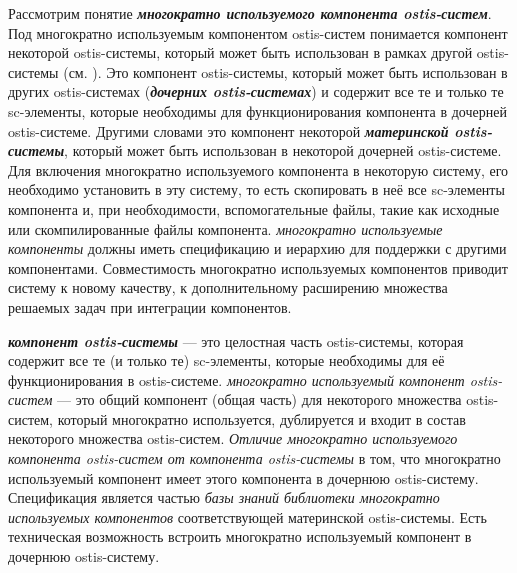 \bigskip

Рассмотрим понятие \textbf{\textit{многократно используемого компонента ostis-систем}}. Под многократно используемым компонентом ostis-систем понимается компонент некоторой ostis-системы, который может быть использован в рамках другой ostis-системы (см. ). Это компонент ostis-системы, который может быть использован в других ostis-системах (\textbf{\textit{дочерних ostis-системах}}) и содержит все те и только те sc-элементы, которые необходимы для функционирования компонента в дочерней ostis-системе. Другими словами это компонент некоторой \textbf{\textit{материнской ostis-системы}}, который может быть использован в некоторой дочерней ostis-системе. Для включения многократно используемого компонента в некоторую систему, его необходимо установить в эту систему, то есть скопировать в неё все sc-элементы компонента и, при необходимости, вспомогательные файлы, такие как исходные или скомпилированные файлы компонента. \textit{многократно используемые компоненты} должны иметь  спецификацию и иерархию для поддержки  с другими компонентами. Совместимость многократно используемых компонентов приводит систему к новому качеству, к дополнительному расширению множества решаемых задач при интеграции компонентов.

\begin{SCn}
\end{SCn}

\textbf{\textit{компонент ostis-системы}} --- это целостная часть ostis-системы, которая содержит все те (и только те) sc-элементы, которые необходимы для её функционирования в ostis-системе. \textit{многократно используемый компонент ostis-систем} --- это общий компонент (общая часть) для некоторого множества ostis-систем, который многократно используется, дублируется и входит в состав некоторого множества ostis-систем.
\textit{Отличие многократно используемого компонента ostis-систем от компонента ostis-системы} в том, что многократно используемый компонент имеет  этого компонента в дочернюю ostis-систему. Спецификация является частью \textit{базы знаний библиотеки многократно используемых компонентов} соответствующей материнской ostis-системы. Есть техническая возможность встроить многократно используемый компонент в дочернюю ostis-систему.

